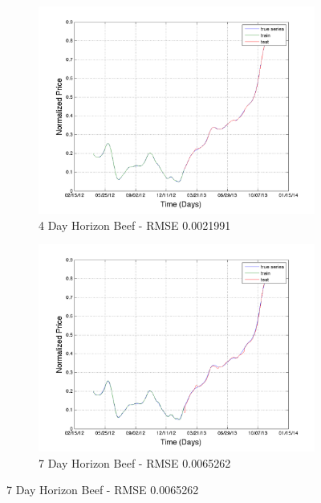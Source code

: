 \begin{figure}[H]
        \centering
        \begin{subfigure}[b]{0.5\textwidth}
                \includegraphics[width=\textwidth]{img/model/beef/model3_3/pred_4}
                \caption{4 Day Horizon Beef - RMSE 0.0021991}
                \label{fig:gull}
        \end{subfigure}%
           \begin{subfigure}[b]{0.5\textwidth}
                \includegraphics[width=\textwidth]{img/model/beef/model3_3/pred_7}
                \caption{7 Day Horizon Beef - RMSE 0.0065262}
                \label{fig:gull}
        \end{subfigure}%
              \hfill    

\end{figure}
